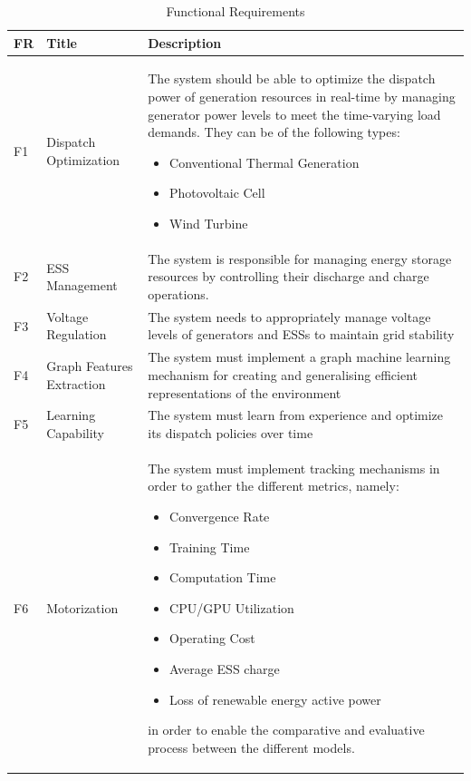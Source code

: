 \begin{table}[H]
	\centering
	\caption{Functional Requirements}
	\begin{tabular}{|P{1cm}|p{4cm}|p{8cm}|  }
		\hline
		\textbf{FR} & \textbf{Title} & \textbf{Description} \\
		\hline
		F1 & Dispatch Optimization & The system should be able to optimize the dispatch power of generation resources in real-time by managing generator power levels to meet the time-varying load demands. They can be of the following types:
		\begin{itemize}
			\item Conventional Thermal Generation
			\item Photovoltaic Cell
			\item Wind Turbine
		\end{itemize} \\
		\hline
		F2 & \ac{ESS} Management & The system is responsible for managing energy storage resources by controlling their discharge and charge operations. \\
		\hline
		F3 & Voltage Regulation & The system needs to appropriately manage voltage levels of generators and \acp{ESS} to maintain grid stability \\
		\hline
		F4 & Graph Features Extraction & The system must implement a graph machine learning mechanism for creating and generalising efficient representations of the environment \\
		\hline
		F5 & Learning Capability & The system must learn from experience and optimize its dispatch policies over time \\
		\hline
		F6 & Motorization & The system must implement tracking mechanisms in order to gather the different metrics, namely: 
		\begin{itemize}
			\item Convergence Rate
			\item Training Time
			\item Computation Time
			\item CPU/GPU Utilization
			\item Operating Cost
			\item Average \ac{ESS} charge
			\item Loss of renewable energy active power
		\end{itemize} 
		in order to enable the comparative and evaluative process between the different models. \\
		\hline
	\end{tabular}
\end{table}

